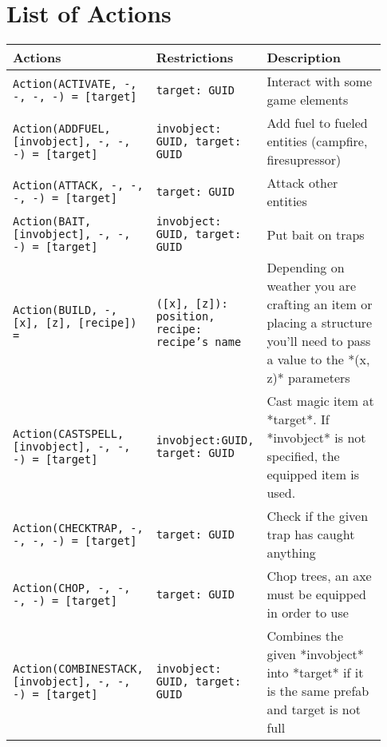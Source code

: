 \chapter{List of Actions}
\label{appendix:A}

\begin{table}[htb]
	\centering
    \caption{The first part of the available actions.}
    \label{tab:actions-1}
    {\footnotesize
    \begin{longtable}{ | p{0.35\linewidth} | p{0.18\linewidth} | p{0.4\linewidth} | }
        \hline 
        \textbf{Actions} & \textbf{Restrictions} & \textbf{Description} \\ \hline \hline
		\texttt{Action(ACTIVATE, -, -, -, -) = [target]} & \texttt{{target: GUID}} & Interact with some game elements \\ \hline 
		\texttt{Action(ADDFUEL, [invobject], -, -, -) = [target]} & \texttt{{invobject: GUID, target: GUID}} & Add fuel to fueled entities (campfire, firesupressor) \\ \hline 
		\texttt{Action(ATTACK, -, -, -, -) = [target]} & \texttt{{target: GUID}} & Attack other entities \\ \hline 
		\texttt{Action(BAIT, [invobject], -, -, -) = [target]} & \texttt{{invobject: GUID, target: GUID}} & Put bait on traps \\ \hline 
		\texttt{Action(BUILD, -, [x], [z], [recipe]) = } & \texttt{{([x], [z]): position, recipe: recipe's name}} & Depending on weather you are crafting an item or placing a structure you'll need to pass a value to the *(x, z)* parameters \\ \hline 
		\texttt{Action(CASTSPELL, [invobject], -, -, -) = [target]} & \texttt{{invobject:GUID, target: GUID}} & Cast magic item at *target*. If *invobject* is not specified, the equipped item is used. \\ \hline 
		\texttt{Action(CHECKTRAP, -, -, -, -) = [target]} & \texttt{{target: GUID}} & Check if the given trap has caught anything \\ \hline 
		\texttt{Action(CHOP, -, -, -, -) = [target]} & \texttt{{target: GUID}} & Chop trees, an axe must be equipped in order to use \\ \hline 
		\texttt{Action(COMBINESTACK, [invobject], -, -, -) = [target]} & \texttt{{invobject: GUID, target: GUID}} & Combines the given *invobject* into *target* if it is the same prefab and target is not full \\ \hline 

\end{longtable}}
\end{table}
